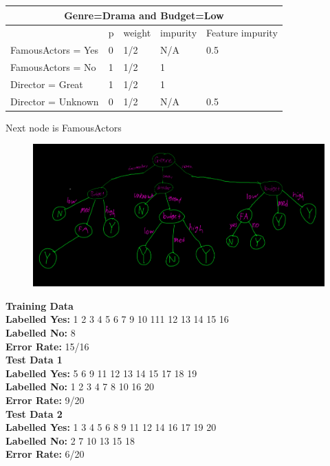 \documentclass[letter]{article}
\theoremstyle{case}
\begin{document}
\begin{table}[!h]
\begin{tabular}{|l|l|l|l|l|}
\hline
\multicolumn{5}{|c|}{Genre=Drama and Budget=Low}              \\ \hline
                   & p & weight & impurity & Feature impurity \\ \hline
FamousActors = Yes & 0 & 1/2    & N/A      & 0.5              \\ \cline{1-4}
FamousActors = No  & 1 & 1/2    & 1        &                  \\ \hline
Director = Great   & 1 & 1/2    & 1        &                  \\ \cline{1-4}
Director = Unknown & 0 & 1/2    & N/A      & 0.5              \\ \hline
\end{tabular}
\end{table} 
Next node is FamousActors \\
\begin{figure}[h!]
	\includegraphics[scale=0.4]{part2.png}
\end{figure}
\newpage
\textbf{Training Data} \\
\textbf{Labelled Yes: } 1 2 3 4 5 6 7 9 10 111 12 13 14 15 16 \\
\textbf{Labelled No: } 8 \\
\textbf{Error Rate: } 15/16 \\

\textbf{Test Data 1} \\
\textbf{Labelled Yes: } 5 6 9 11 12 13 14 15 17 18 19\\
\textbf{Labelled No: } 1 2 3 4 7 8 10 16 20 \\
\textbf{Error Rate: } 9/20\\

\textbf{Test Data 2} \\
\textbf{Labelled Yes: } 1 3 4 5 6 8 9 11 12 14 16 17 19 20 \\
\textbf{Labelled No: } 2 7 10 13 15 18 \\
\textbf{Error Rate: } 6/20\\
\end{document}
